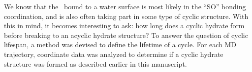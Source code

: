 \documentclass{article}
\begin{document}
We know that the \suldiox~bound to a water surface is most likely in the ``SO'' bonding coordination, and is also often taking part in some type of cyclic structure. With this in mind, it becomes interesting to ask: how long does a cyclic hydrate form before breaking to an acyclic hydrate structure? To answer the question of cyclic lifespan, a method was devised to define the lifetime of a cycle. For each MD trajectory, coordinate data was analyzed to determine if a cyclic hydrate structure was formed as described earlier in this manuscript. %


\end{document}
